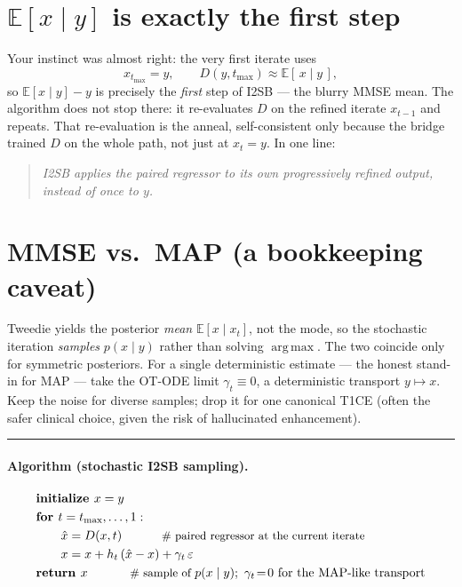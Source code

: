 \documentclass[11pt]{article}
\newcommand{\E}{\mathbb{E}}
\newcommand{\eps}{\varepsilon}
\DeclareMathOperator*{\argmax}{arg\,max}
\begin{document}
\section{\texorpdfstring{$\E[x\mid y]$}{E[x|y]} is exactly the first step}
Your instinct was almost right: the very first iterate uses
\begin{equation}
  x_{t_{\max}} = y, \qquad D(y, t_{\max}) \approx \E[\,x \mid y\,],
\end{equation}
so $\E[x\mid y] - y$ is precisely the \emph{first} step of I2SB --- the blurry MMSE mean. The
algorithm does not stop there: it re-evaluates $D$ on the refined iterate $x_{t-1}$ and
repeats. That re-evaluation is the anneal, self-consistent only because the bridge trained
$D$ on the whole path, not just at $x_t = y$. In one line:
\begin{quote}
  \emph{I2SB applies the paired regressor to its own progressively refined output, instead of
  once to $y$.}
\end{quote}

\section{MMSE vs.\ MAP (a bookkeeping caveat)}
Tweedie yields the posterior \emph{mean} $\E[x\mid x_t]$, not the mode, so the stochastic
iteration \emph{samples} $p(x\mid y)$ rather than solving $\argmax$. The two coincide only for
symmetric posteriors. For a single deterministic estimate --- the honest stand-in for MAP ---
take the OT-ODE limit $\gamma_t \equiv 0$, a deterministic transport $y \mapsto x$. Keep the
noise for diverse samples; drop it for one canonical T1CE (often the safer clinical choice,
given the risk of hallucinated enhancement).

\begin{center}\rule{0.5\textwidth}{0.4pt}\end{center}

\paragraph{Algorithm (stochastic I2SB sampling).}
\begin{equation*}
\begin{aligned}
  &\textbf{initialize } x = y \\
  &\textbf{for } t = t_{\max}, \ldots, 1:\\
  &\qquad \hat{x} = D(x, t) \hspace{3.2em}\text{\small\# paired regressor at the current iterate}\\
  &\qquad x = x + h_t\,(\hat{x} - x) + \gamma_t\,\eps \\
  &\textbf{return } x \hspace{3.4em}\text{\small\# sample of }p(x\mid y);\ \gamma_t\!=\!0\text{ for the MAP-like transport}
\end{aligned}
\end{equation*}
\end{document}
